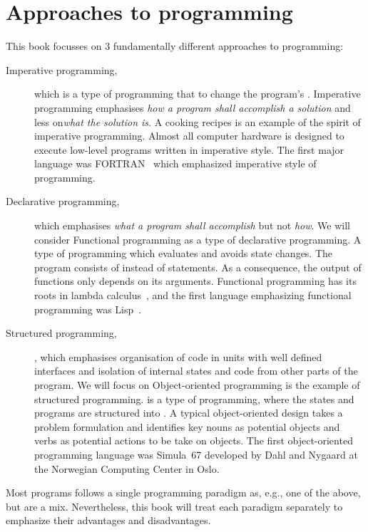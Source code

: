 \section{Approaches to programming}
This book focusses on 3 fundamentally different approaches to programming: 
\begin{description}
\item[Imperative programming,] which is a type of programming that  to change the program's . Imperative programming emphasises \emph{how a program shall accomplish a solution} and less on\emph{what the solution is}. A cooking recipes is an example of the spirit of imperative programming. Almost all computer hardware is designed to execute low-level programs written in imperative style. The first major language was FORTRAN~\cite{backus54} which emphasized imperative style of programming.
\item[Declarative programming,] which emphasises \emph{what a program shall accomplish} but not \emph{how}. We will consider Functional programming as a type of declarative programming.  A type of programming which evaluates  and avoids state changes. The program consists of  instead of statements. As a consequence, the output of functions only depends on its arguments. Functional programming has its roots in lambda calculus~\cite{church32}, and the first language emphasizing functional programming was Lisp~\cite{mccarthy60}. 
\item[Structured programming,], which emphasises organisation of code in units with well defined interfaces and isolation of internal states and code from other parts of the program. We will focus on Object-oriented programming is the example of structured programming.  is a type of programming, where the states and programs are structured into . A typical object-oriented design takes a problem formulation and identifies key nouns as potential objects and verbs as potential actions to be take on objects. The first object-oriented programming language was Simula~67 developed by Dahl and Nygaard at the Norwegian Computing Center in Oslo.
\end{description}
Most programs follows a single programming paradigm as, e.g., one of the above, but are a mix. Nevertheless, this book will treat each paradigm separately to emphasize their advantages and disadvantages.


